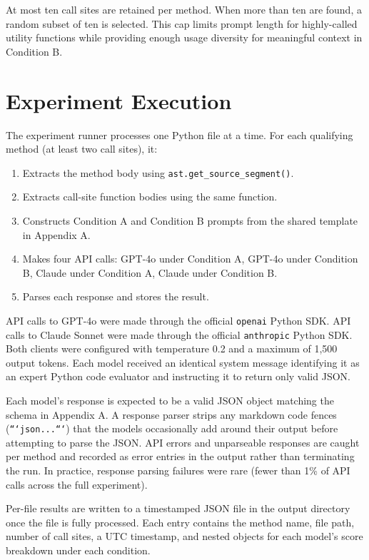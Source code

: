 \documentclass[12pt]{report}
\begin{document}
At most ten call sites are retained per method. When more than ten are found, a random subset of ten is selected. This cap limits prompt length for highly-called utility functions while providing enough usage diversity for meaningful context in Condition B.

\section{Experiment Execution}

The experiment runner processes one Python file at a time. For each qualifying method (at least two call sites), it:

\begin{enumerate}
    \item Extracts the method body using \texttt{ast.get\_source\_segment()}.
    \item Extracts call-site function bodies using the same function.
    \item Constructs Condition A and Condition B prompts from the shared template in Appendix A.
    \item Makes four API calls: GPT-4o under Condition A, GPT-4o under Condition B, Claude under Condition A, Claude under Condition B.
    \item Parses each response and stores the result.
\end{enumerate}

API calls to GPT-4o were made through the official \texttt{openai} Python SDK. API calls to Claude Sonnet were made through the official \texttt{anthropic} Python SDK. Both clients were configured with temperature 0.2 and a maximum of 1,500 output tokens. Each model received an identical system message identifying it as an expert Python code evaluator and instructing it to return only valid JSON.

Each model's response is expected to be a valid JSON object matching the schema in Appendix A. A response parser strips any markdown code fences (\texttt{```json...```}) that the models occasionally add around their output before attempting to parse the JSON. API errors and unparseable responses are caught per method and recorded as error entries in the output rather than terminating the run. In practice, response parsing failures were rare (fewer than 1\% of API calls across the full experiment).

Per-file results are written to a timestamped JSON file in the output directory once the file is fully processed. Each entry contains the method name, file path, number of call sites, a UTC timestamp, and nested objects for each model's score breakdown under each condition.
\end{document}
